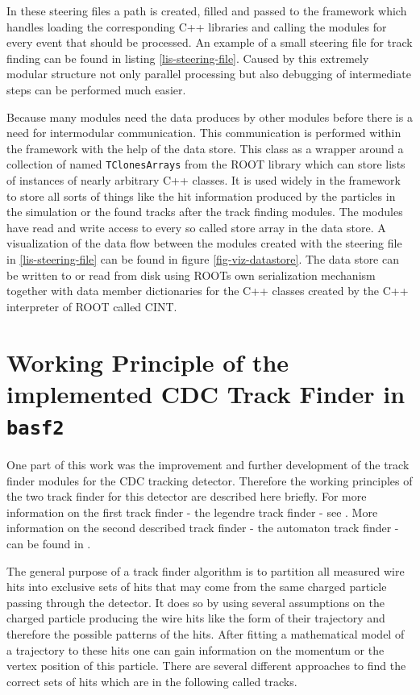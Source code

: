 In these steering files a path is created, filled and passed to the framework which handles loading the corresponding C++ libraries and calling the modules for every event that should be processed. An example of a small steering file for track finding can be found in listing \ref{lis-steering-file}.  Caused by this extremely modular structure not only parallel processing but also debugging of intermediate steps can be performed much easier.

Because many modules need the data produces by other modules before there is a need for intermodular communication. This communication is performed within the framework with the help of the data store. This class as a wrapper around a collection of named \texttt{TClonesArrays} from the ROOT library \cite{tclonesarray} which can store lists of instances of nearly arbitrary C++ classes. It is used widely in the framework to store all sorts of things like the hit information produced by the particles in the simulation or the found tracks after the track finding modules. The modules have read and write access to every so called store array in the data store. A visualization of the data flow between the modules created with the steering file in \ref{lis-steering-file} can be found in figure \ref{fig-viz-datastore}. The data store can be written to or read from disk using ROOTs own serialization mechanism together with data member dictionaries for the C++ classes created by the C++ interpreter of ROOT called CINT.

\section{Working Principle of the implemented CDC Track Finder in \texttt{basf2}}

One part of this work was the improvement and further development of the track finder modules for the CDC tracking detector. Therefore the working principles of the two track finder for this detector are described here briefly. For more information on the first track finder - the legendre track finder - see \cite{kronenbitter}. More information on the second described track finder - the automaton track finder - can be found in \cite{oliver}.

The general purpose of a track finder algorithm is to partition all measured wire hits into exclusive sets of hits that may come from the same charged particle passing through the detector. It does so by using several assumptions on the charged particle producing the wire hits like the form of their trajectory and therefore the possible patterns of the hits. After fitting a mathematical model of a trajectory to these hits one can gain information on the momentum or the vertex position of this particle. There are several different approaches to find the correct sets of hits which are in the following called tracks.


